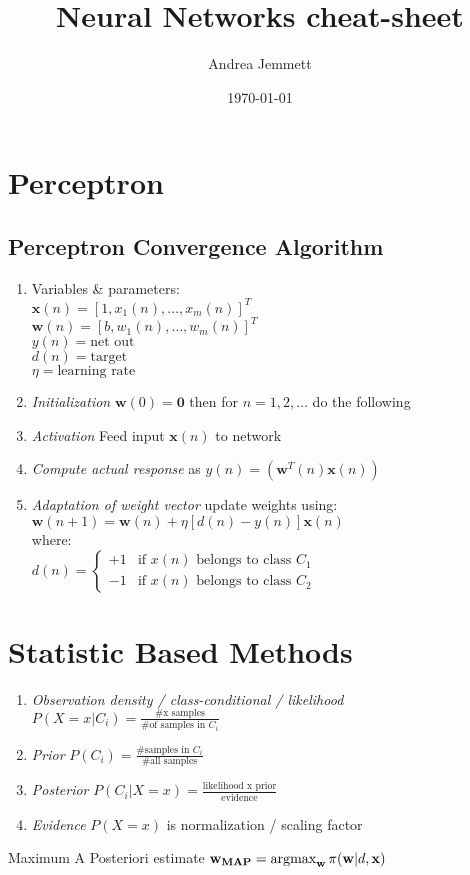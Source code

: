 \documentclass[11pt]{article}
\title{Neural Networks cheat-sheet}
\author{Andrea Jemmett}
\date{\today}
\newcommand{\argmax}{\operatornamewithlimits{argmax}}
\newcommand{\sign}{}
\begin{document}
\maketitle

\section{Perceptron}
\subsection{Perceptron Convergence Algorithm}
\footnotesize
\begin{enumerate}
	\item Variables \& parameters:\\
	$\mathbf{x}(n) = \left[1, x_1(n), \dots, x_m(n)\right]^T$\\
	$\mathbf{w}(n) = \left[b, w_1(n), \dots, w_m(n)\right]^T$\\
	$y(n) = \mbox{net out}$\\
	$d(n) = \mbox{target}$\\
	$\eta = \mbox{learning rate}$
	\item \emph{Initialization} $\mathbf{w}(0) = \mathbf{0}$ then for $n = 1, 2, \dots$ do the following
	\item \emph{Activation} Feed input $\mathbf{x}(n)$ to network
	\item \emph{Compute actual response} as $y(n) = \sign(\mathbf{w}^T(n)\mathbf{x}(n))$
	\item \emph{Adaptation of weight vector} update weights using:\\
	$\mathbf{w}(n+1) = \mathbf{w}(n)+\eta[d(n)-y(n)]\mathbf{x}(n)$\\
	where:\\
	$d(n) = \begin{cases} +1 & \mbox{if }x(n)\mbox{ belongs to class }C_1 \\ -1 & \mbox{if }x(n)\mbox{ belongs to class }C_2 \end{cases}$
\end{enumerate}
\normalsize

\section{Statistic Based Methods}
\begin{enumerate}
	\item \emph{Observation density / class-conditional / likelihood}\\ $P(X=x|C_i) = \frac{\mbox{\# x samples}}{\mbox{\# of samples in }C_i}$
	\item \emph{Prior} $P(C_i) = \frac{\mbox{\# samples in }C_i}{\mbox{\# all samples}}$
	\item \emph{Posterior} $P(C_i|X=x) = \frac{\mbox{likelihood x prior}}{\mbox{evidence}}$
	\item \emph{Evidence} $P(X=x)$ is normalization / scaling factor
\end{enumerate}
Maximum A Posteriori estimate
$\mathbf{w_{MAP}} = \argmax_{\mathbf{w}} \pi(\mathbf{w}|d,\mathbf{x})$
\end{document}
